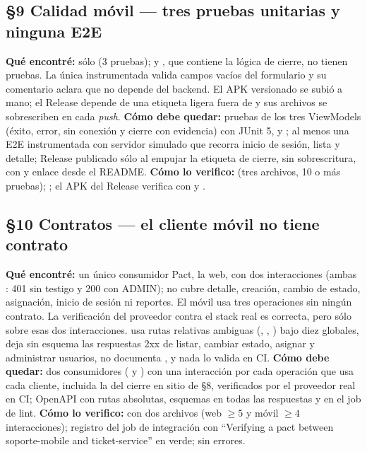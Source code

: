 \subsection*{\S9 Calidad m\'ovil --- tres pruebas unitarias y ninguna E2E}
\textbf{Qu\'e encontr\'e:} s\'olo  (3 pruebas);  y , que contiene la l\'ogica de cierre, no tienen pruebas. La \'unica instrumentada valida campos vac\'ios del formulario y su comentario aclara que no depende del backend. El APK versionado se subi\'o a mano; el Release depende de una etiqueta ligera fuera de  y sus archivos se sobrescriben en cada \emph{push}. \textbf{C\'omo debe quedar:} pruebas de los tres ViewModels (\'exito, error, sin conexi\'on y cierre con evidencia) con JUnit 5,  y ; al menos una E2E instrumentada con servidor simulado que recorra inicio de sesi\'on, lista y detalle; Release publicado s\'olo al empujar la etiqueta de cierre, sin sobrescritura, con  y enlace desde el README. \textbf{C\'omo lo verifico:}  (tres archivos, 10 o m\'as pruebas); ; el APK del Release verifica con  y .

\subsection*{\S10 Contratos --- el cliente m\'ovil no tiene contrato}
\textbf{Qu\'e encontr\'e:} un \'unico consumidor Pact, la web, con dos interacciones (ambas : 401 sin testigo y 200 con ADMIN); no cubre detalle, creaci\'on, cambio de estado, asignaci\'on, inicio de sesi\'on ni reportes. El m\'ovil usa tres operaciones sin ning\'un contrato. La verificaci\'on del proveedor contra el stack real es correcta, pero s\'olo sobre esas dos interacciones.  usa rutas relativas ambiguas (\rt{/}, , ) bajo diez  globales, deja sin esquema las respuestas 2xx de listar, cambiar estado, asignar y administrar usuarios, no documenta , y nada lo valida en CI. \textbf{C\'omo debe quedar:} dos consumidores ( y ) con una interacci\'on por cada operaci\'on que usa cada cliente, incluida la del cierre en sitio de \S8, verificados por el proveedor real en CI; OpenAPI con rutas absolutas, esquemas en todas las respuestas y  en el job de lint. \textbf{C\'omo lo verifico:}  con dos archivos (web $\ge 5$ y m\'ovil $\ge 4$ interacciones); registro del job de integraci\'on con ``Verifying a pact between soporte-mobile and ticket-service'' en verde;  sin errores.

